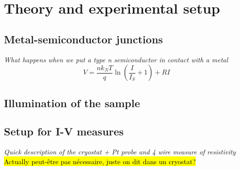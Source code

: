 \section{Theory and experimental setup}
\subsection{Metal-semiconductor junctions}
\emph{What happens when we put a type n semiconductor in contact with a metal}
\begin{equation} \label{eq:IV-curve}
    V = \frac{n k_N T}{q} \ln \left( \frac{I}{I_S} +1 \right) + RI
\end{equation}


\subsection{Illumination of the sample}


\subsection{Setup for I-V measures}
\emph{Quick description of the cryostat + Pt probe and 4 wire measure of resistivity}
\hl{Actually peut-être pas nécessaire, juste on dit dans un cryostat?}
